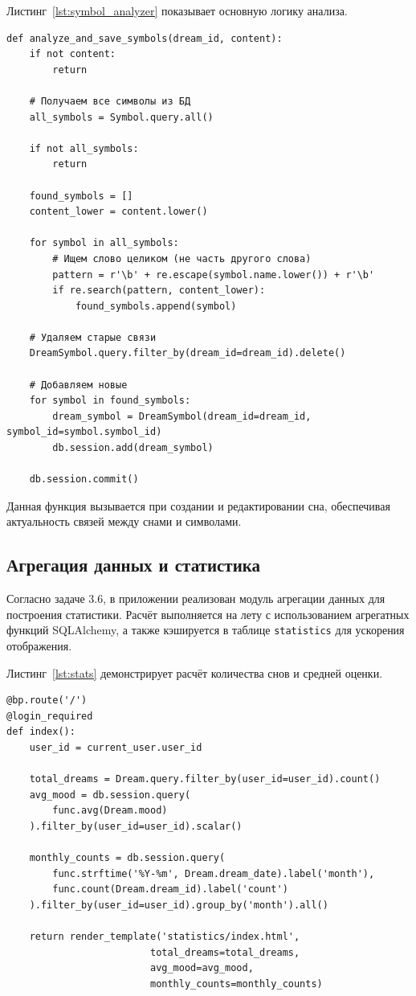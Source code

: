 \documentclass[14pt, a4paper]{extarticle}
\begin{document}
Листинг~\ref{lst:symbol_analyzer} показывает основную логику анализа.

\begin{lstlisting}[caption={Анализ текста и сохранение символов}, label={lst:symbol_analyzer}]
def analyze_and_save_symbols(dream_id, content):
    if not content:
        return
    
    # Получаем все символы из БД
    all_symbols = Symbol.query.all()
    
    if not all_symbols:
        return
    
    found_symbols = []
    content_lower = content.lower()
    
    for symbol in all_symbols:
        # Ищем слово целиком (не часть другого слова)
        pattern = r'\b' + re.escape(symbol.name.lower()) + r'\b'
        if re.search(pattern, content_lower):
            found_symbols.append(symbol)
    
    # Удаляем старые связи
    DreamSymbol.query.filter_by(dream_id=dream_id).delete()
    
    # Добавляем новые
    for symbol in found_symbols:
        dream_symbol = DreamSymbol(dream_id=dream_id, symbol_id=symbol.symbol_id)
        db.session.add(dream_symbol)
    
    db.session.commit()
\end{lstlisting}

Данная функция вызывается при создании и редактировании сна, обеспечивая актуальность связей между снами и символами.

\subsection{Агрегация данных и статистика}

Согласно задаче 3.6, в приложении реализован модуль агрегации данных для построения статистики. Расчёт выполняется на лету с использованием агрегатных функций SQLAlchemy, а также кэшируется в таблице \texttt{statistics} для ускорения отображения.

Листинг~\ref{lst:stats} демонстрирует расчёт количества снов и средней оценки.

\begin{lstlisting}[caption={Расчёт основных статистических показателей}, label={lst:stats}]
@bp.route('/')
@login_required
def index():
    user_id = current_user.user_id
    
    total_dreams = Dream.query.filter_by(user_id=user_id).count()
    avg_mood = db.session.query(
        func.avg(Dream.mood)
    ).filter_by(user_id=user_id).scalar()
    
    monthly_counts = db.session.query(
        func.strftime('%Y-%m', Dream.dream_date).label('month'),
        func.count(Dream.dream_id).label('count')
    ).filter_by(user_id=user_id).group_by('month').all()
    
    return render_template('statistics/index.html', 
                         total_dreams=total_dreams,
                         avg_mood=avg_mood,
                         monthly_counts=monthly_counts)
\end{lstlisting}
\end{document}
